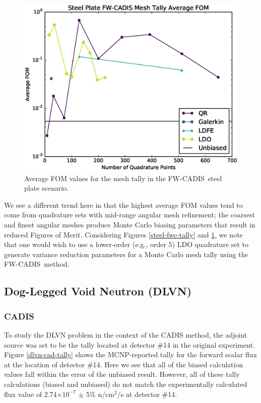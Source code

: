 \documentclass{article} %
\newcommand{\E}[1]{$\times10^{#1}$}
\newcommand{\fwc}{\mbox{FW-CADIS}}
\begin{document}
\begin{figure}[!htb]
\centering
\includegraphics[max height=0.445\textheight]{img/steel-fwcadis-fom.eps}
\caption{Average FOM values for the mesh tally in the \fwc\ steel plate scenario.}
\label{steel-fwc-fom}
\end{figure}

We see a different trend here in that the highest average FOM values tend to
come from quadrature sets with mid-range angular mesh refinement; the coarsest
and finest angular meshes produce Monte Carlo biasing parameters that result
in reduced Figures of Merit. Considering Figures \ref{steel-fwc-tally} and
\ref{steel-fwc-fom}, we note that one would wish to use a lower-order (e.g.,
order 5) LDO quadrature set to generate variance reduction parameters for a
Monte Carlo mesh tally using the \fwc\ method.

\FloatBarrier
\subsection{Dog-Legged Void Neutron (DLVN)}

\subsubsection{CADIS}

To study the DLVN problem in the context of the CADIS method, the adjoint
source was set to be the tally located at detector \#14 in the original
experiment. Figure \ref{dlvn-cad-tally} shows the MCNP-reported tally for the
forward scalar flux at the location of detector \#14. Here we see that all of
the biased calculation values fall within the error of the unbiased result.
However, all of these tally calculations (biased and unbiased) do not match
the experimentally calculated flux value of 2.74\E{-7} $\pm$ 5\% n/cm$^2$/s
at detector \#14.
\end{document}
